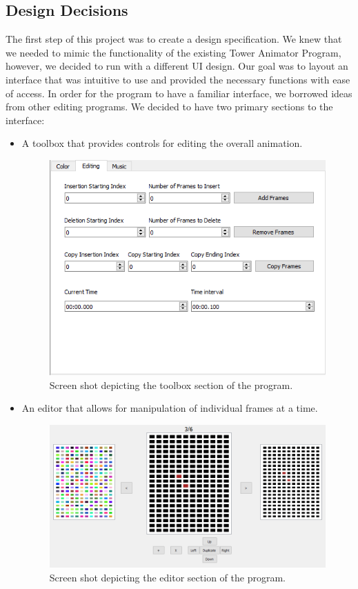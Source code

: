 \documentclass[12pt]{article}
\begin{document}
	\subsection{Design Decisions}
	The first step of this project was to create a design specification. We knew that we needed to mimic the functionality of the existing Tower Animator Program, however, we decided to run with a different UI design. Our goal was to layout an interface that was intuitive to use and provided the necessary functions with ease of access. In order for the program to have a familiar interface, we borrowed ideas from other editing programs. We decided to have two primary sections to the interface:
	\begin{itemize}
		\item A toolbox that provides controls for editing the overall animation.
		\begin{figure}[!htb]
			\includegraphics[]{./screenshots/toolbox}
			\caption{Screen shot depicting the toolbox section of the program.}
			\label{fig:toolbox}
		\end{figure}
		\clearpage
		\item An editor that allows for manipulation of individual frames at a time.
		\begin{figure}[!htb]
			\includegraphics[width=\linewidth]{./screenshots/editor}
			\caption{Screen shot depicting the editor section of the program.}
			\label{fig:editor}
		\end{figure}
	\end{itemize}
\end{document}
